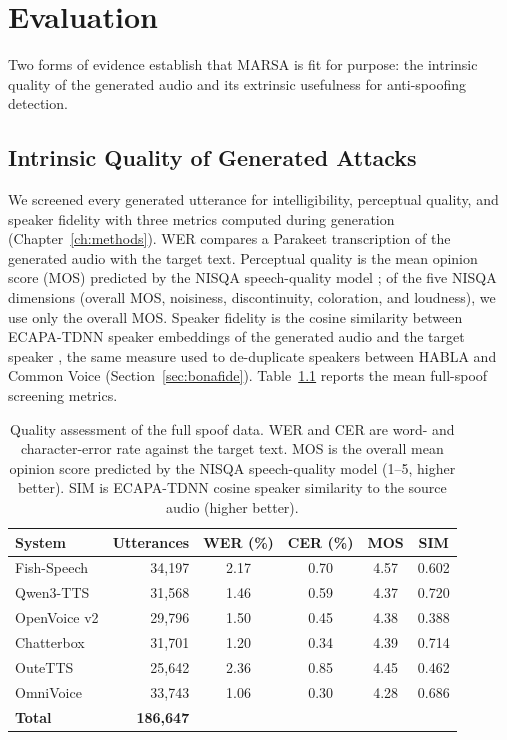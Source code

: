 \documentclass[11pt]{report}
\begin{document}
\chapter{Evaluation}
\label{ch:evaluation}

Two forms of evidence establish that MARSA is fit for
purpose: the intrinsic quality of the generated audio and its extrinsic
usefulness for anti-spoofing detection.

\section{Intrinsic Quality of Generated Attacks}

We screened every generated utterance for
intelligibility, perceptual quality, and speaker fidelity with three
metrics computed during generation (Chapter~\ref{ch:methods}). WER
compares a Parakeet transcription of the generated audio with the target
text. Perceptual quality is the mean opinion score (MOS) predicted by the
NISQA speech-quality model \citep{nisqa}; of the five NISQA dimensions
(overall MOS, noisiness, discontinuity, coloration, and loudness), we use
only the overall MOS. Speaker fidelity is the cosine similarity between
ECAPA-TDNN speaker embeddings of the generated audio and the target
speaker \citep{ecapa}, the same measure used to de-duplicate speakers
between HABLA and Common Voice
(Section~\ref{sec:bonafide}).
Table~\ref{tab:fullspoof} reports the mean full-spoof screening
metrics.

\begin{table}[H]
\centering
\caption{Quality assessment of the full spoof data.
WER and CER are word- and character-error rate against the target
text. MOS is the overall mean opinion score predicted by the NISQA speech-quality model \citep{nisqa} (1--5, higher better). SIM
is ECAPA-TDNN cosine speaker similarity to the source audio (higher better).}
\label{tab:fullspoof}
\small
\begin{tabular}{lrcccc}
\toprule
\textbf{System} & \textbf{Utterances} & \textbf{WER (\%)} & \textbf{CER (\%)} & \textbf{MOS} & \textbf{SIM} \\
\midrule
Fish-Speech & 34{,}197 & 2.17 & 0.70 & 4.57 & 0.602 \\
Qwen3-TTS              & 31{,}568 & 1.46 & 0.59 & 4.37 & 0.720 \\
OpenVoice v2           & 29{,}796 & 1.50 & 0.45 & 4.38 & 0.388 \\
Chatterbox             & 31{,}701 & 1.20 & 0.34 & 4.39 & 0.714 \\
OuteTTS                & 25{,}642 & 2.36 & 0.85 & 4.45 & 0.462 \\
OmniVoice              & 33{,}743 & 1.06 & 0.30 & 4.28 & 0.686 \\
\midrule
\textbf{Total}         & \textbf{186{,}647} & & & & \\
\bottomrule
\end{tabular}
\end{table}
\end{document}

